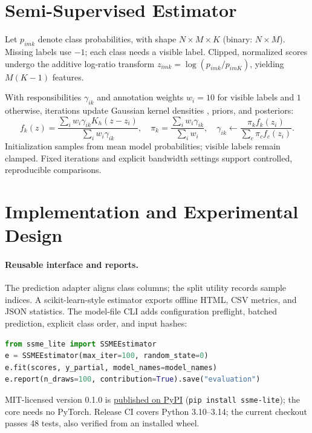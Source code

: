 \documentclass[twoside,11pt]{article}
\begin{document}
\section{Semi-Supervised Estimator}
Let $p_{imk}$ denote class probabilities, with shape $N\times M\times K$ (binary: $N\times M$). Missing labels use $-1$; each class needs a visible label. Clipped, normalized scores undergo the additive log-ratio transform \citep{aitchison1982} $z_{imk}=\log(p_{imk}/p_{imK})$, yielding $M(K-1)$ features.

With responsibilities $\gamma_{ik}$ and annotation weights $w_i=10$ for visible labels and $1$ otherwise, iterations update Gaussian kernel densities \citep{scott1992}, priors, and posteriors:
\begin{equation}
 f_k(z)=\frac{\sum_i w_i\gamma_{ik}K_h(z-z_i)}{\sum_i w_i\gamma_{ik}},\quad
 \pi_k=\frac{\sum_i w_i\gamma_{ik}}{\sum_i w_i},\quad
 \gamma_{ik}\leftarrow\frac{\pi_k f_k(z_i)}{\sum_c\pi_c f_c(z_i)}.
\end{equation}
Initialization samples from mean model probabilities; visible labels remain clamped. Fixed iterations and explicit bandwidth settings support controlled, reproducible comparisons.

\clearpage
\section{Implementation and Experimental Design}
\paragraph{Reusable interface and reports.}
The prediction adapter aligns class columns; the split utility records sample indices. A scikit-learn-style estimator \citep{pedregosa2011} exports offline HTML, CSV metrics, and JSON statistics. The model-file CLI adds configuration preflight, batched prediction, explicit class order, and input hashes:
\begin{lstlisting}[language=Python]
from ssme_lite import SSMEEstimator
e = SSMEEstimator(max_iter=100, random_state=0)
e.fit(scores, y_partial, model_names=model_names)
e.report(n_draws=100, contribution=True).save("evaluation")
\end{lstlisting}
MIT-licensed version 0.1.0 is \href{https://pypi.org/project/ssme-lite/}{published on PyPI} (\texttt{pip install ssme-lite}); the core needs no PyTorch. Release CI covers Python 3.10--3.14; the current checkout passes 48 tests, also verified from an installed wheel.
\end{document}

